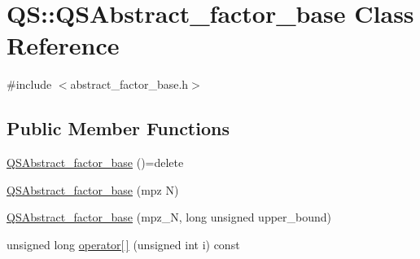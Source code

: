 \hypertarget{classQS_1_1QSAbstract__factor__base}{\section{Q\-S\-:\-:Q\-S\-Abstract\-\_\-factor\-\_\-base Class Reference}
\label{classQS_1_1QSAbstract__factor__base}
}


{\ttfamily \#include $<$abstract\-\_\-factor\-\_\-base.\-h$>$}

\subsection*{Public Member Functions}
\begin{DoxyCompactItemize}
\item 
\hyperlink{classQS_1_1QSAbstract__factor__base_a0e8ac8af195769112d43826335444912}{Q\-S\-Abstract\-\_\-factor\-\_\-base} ()=delete
\item 
\hyperlink{classQS_1_1QSAbstract__factor__base_acca2d1529bc9078dc89c9a52820879af}{Q\-S\-Abstract\-\_\-factor\-\_\-base} (mpz N)
\item 
\hyperlink{classQS_1_1QSAbstract__factor__base_af7147eede5ab1787ddf7c0ff5ea49672}{Q\-S\-Abstract\-\_\-factor\-\_\-base} (mpz\-\_\-\-N, long unsigned upper\-\_\-bound)
\item 
unsigned long \hyperlink{classQS_1_1QSAbstract__factor__base_aeb45c56826663692b8537b0ba3ae64ee}{operator\mbox{[}$\,$\mbox{]}} (unsigned int i) const 
\end{DoxyCompactItemize}


